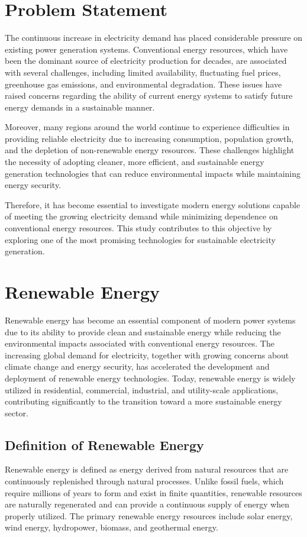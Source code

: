 \section{Problem Statement}
The continuous increase in electricity demand has placed considerable pressure on existing power generation systems. Conventional energy resources, which have been the dominant source of electricity production for decades, are associated with several challenges, including limited availability, fluctuating fuel prices, greenhouse gas emissions, and environmental degradation. These issues have raised concerns regarding the ability of current energy systems to satisfy future energy demands in a sustainable manner.

Moreover, many regions around the world continue to experience difficulties in providing reliable electricity due to increasing consumption, population growth, and the depletion of non-renewable energy resources. These challenges highlight the necessity of adopting cleaner, more efficient, and sustainable energy generation technologies that can reduce environmental impacts while maintaining energy security.

Therefore, it has become essential to investigate modern energy solutions capable of meeting the growing electricity demand while minimizing dependence on conventional energy resources. This study contributes to this objective by exploring one of the most promising technologies for sustainable electricity generation.


\section{Renewable Energy}
Renewable energy has become an essential component of modern power systems due to its ability to provide clean and sustainable energy while reducing the environmental impacts associated with conventional energy resources. The increasing global demand for electricity, together with growing concerns about climate change and energy security, has accelerated the development and deployment of renewable energy technologies. Today, renewable energy is widely utilized in residential, commercial, industrial, and utility-scale applications, contributing significantly to the transition toward a more sustainable energy sector.

\subsection{Definition of Renewable Energy}
Renewable energy is defined as energy derived from natural resources that are continuously replenished through natural processes. Unlike fossil fuels, which require millions of years to form and exist in finite quantities, renewable resources are naturally regenerated and can provide a continuous supply of energy when properly utilized. The primary renewable energy resources include solar energy, wind energy, hydropower, biomass, and geothermal energy.

